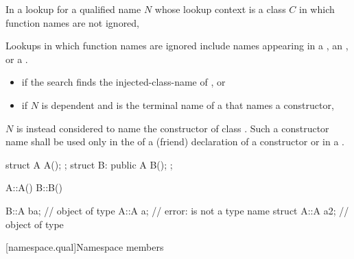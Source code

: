 \pnum
In a lookup for a qualified name $N$ whose lookup context is a class $C$
in which function names are not ignored,
\begin{footnote}
Lookups in which
function names are ignored include names appearing in a
, an
, or a .
\end{footnote}
\begin{itemize}
\item
if the search finds the injected-class-name of , or
\item
if $N$ is dependent and
is the terminal name of a 
that names a constructor,
\end{itemize}
$N$ is instead considered to name the constructor of class .
Such a constructor name shall be used only
in the  of a (friend) declaration of a constructor or
in a .
\begin{example}
\begin{codeblock}
struct A { A(); };
struct B: public A { B(); };

A::A() { }
B::B() { }

B::A ba;            // object of type 
A::A a;             // error:  is not a type name
struct A::A a2;     // object of type 
\end{codeblock}
\end{example}

[namespace.qual]{Namespace members}

